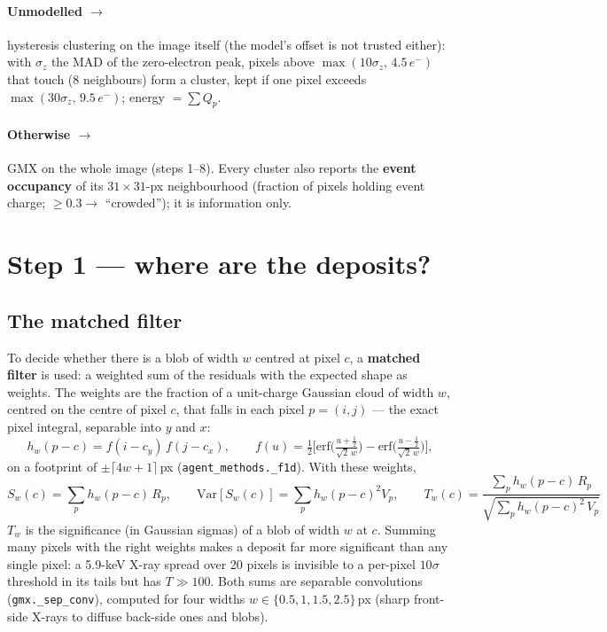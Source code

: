\documentclass[11pt,a4paper]{article}
\newcommand{\el}{\ensuremath{e^-}}
\newcommand{\code}[1]{\texttt{#1}}
\begin{document}
\paragraph{Unmodelled $\to$} hysteresis clustering on the image itself (the model's offset is not trusted either): with
$\sigma_z$ the MAD of the zero-electron peak, pixels above $\max(10\sigma_z,\,4.5\,\el)$ that touch (8 neighbours) form a
cluster, kept if one pixel exceeds $\max(30\sigma_z,\,9.5\,\el)$; energy $=\sum Q_p$.

\paragraph{Otherwise $\to$} GMX on the whole image (steps 1--8). Every cluster also reports the \textbf{event occupancy} of its
$31\times31$-px neighbourhood (fraction of pixels holding event charge; $\ge0.3\to$ ``crowded''); it is information only.

\section{Step 1 --- where are the deposits?}

\subsection{The matched filter}
To decide whether there is a blob of width $w$ centred at pixel $c$, a \textbf{matched filter} is used: a weighted sum of the
residuals with the expected shape as weights. The weights are the fraction of a unit-charge Gaussian cloud of width $w$, centred
on the centre of pixel $c$, that falls in each pixel $p=(i,j)$ --- the exact pixel integral, separable into $y$ and $x$:
\begin{equation}
h_w(p-c)=f(i-c_y)\,f(j-c_x),\qquad f(u)=\tfrac12\Big[\mathrm{erf}\Big(\tfrac{u+\frac12}{\sqrt2\,w}\Big)-\mathrm{erf}\Big(\tfrac{u-\frac12}{\sqrt2\,w}\Big)\Big],
\end{equation}
on a footprint of $\pm\lceil4w+1\rceil$\,px (\code{agent\_methods.\_f1d}). With these weights,
\begin{equation}
S_w(c)=\sum_p h_w(p-c)\,R_p,\qquad \mathrm{Var}[S_w(c)]=\sum_p h_w(p-c)^2V_p,\qquad
\boxed{T_w(c)=\frac{\sum_p h_w(p-c)\,R_p}{\sqrt{\sum_p h_w(p-c)^2\,V_p}}}
\end{equation}
$T_w$ is the significance (in Gaussian sigmas) of a blob of width $w$ at $c$. Summing many pixels with the right weights makes a
deposit far more significant than any single pixel: a 5.9-keV X-ray spread over 20 pixels is invisible to a per-pixel
$10\sigma$ threshold in its tails but has $T\gg100$. Both sums are separable convolutions (\code{gmx.\_sep\_conv}),
computed for four widths $w\in\{0.5,1,1.5,2.5\}$\,px (sharp front-side X-rays to diffuse back-side ones and blobs).
\end{document}
